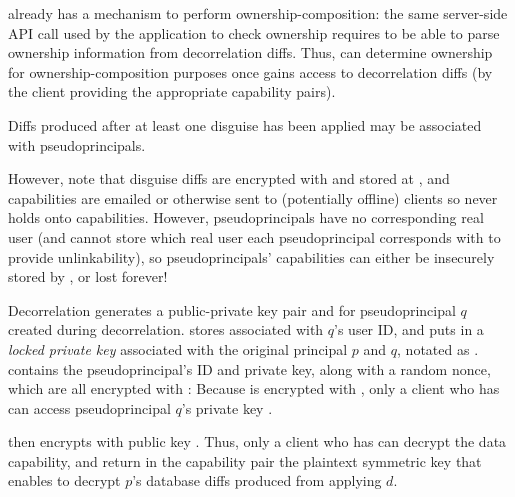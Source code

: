\sys already has a mechanism to perform ownership-composition: the same server-side API call used by
the application to check ownership requires \sys to be able to parse ownership information from
decorrelation diffs. Thus, \sys can determine ownership for ownership-composition purposes once \sys
gains access to decorrelation diffs (by the client providing the appropriate capability pairs).

Diffs produced after at least one disguise has been applied may be associated with pseudoprincipals.

However, note that disguise diffs are encrypted with  and stored at
, and capabilities are emailed or otherwise sent to (potentially offline) clients
so \sys never holds onto capabilities. However, pseudoprincipals have no corresponding real user
(and \sys cannot store which real user each pseudoprincipal corresponds with to provide
unlinkability), so pseudoprincipals' capabilities can either be insecurely stored by \sys, or lost
forever!

\iffalse
{}
Decorrelation generates a public-private key pair  and  for pseudoprincipal $q$
created during decorrelation.
\sys stores  associated with $q$'s user ID, and puts  in a \emph{locked private key}
associated with the original principal $p$ and $q$, notated as .  contains the
pseudoprincipal's ID and private key, along with a random nonce, which are all encrypted with :
Because  is encrypted with , only a client who has
 can access pseudoprincipal $q$'s private key .


\sys then encrypts  with public key .  
%
Thus, only a client who has  can decrypt the data capability, and return in the capability pair the plaintext symmetric key that enables \sys to decrypt $p$'s database diffs produced from applying $d$.

